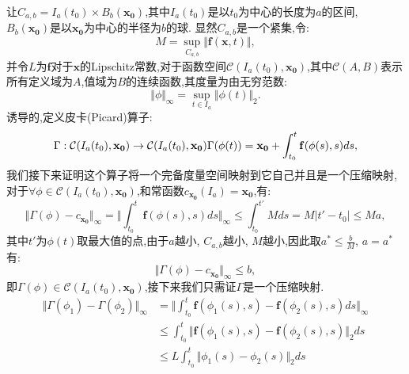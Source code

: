 \begin{pf}
    让$C_{a,b}=I_a(t_0)\times B_b(\mathbf{x_0})$,其中$I_a(t_0)$是以$t_0$为中心的长度为$a$的区间, $B_b(\mathbf{x_0})$是以$\mathbf{x_0}$为中心的半径为$b$的球. 显然$C_{a,b}$是一个紧集,令:
    \begin{equation}
        M=\sup_{C_{a,b}}\Vert \mathbf{f}(\mathbf{x},t)\Vert,
    \end{equation}
    并令$L$为$\mathbf{f}$对于$\mathbf{x}$的Lipschitz常数,对于函数空间$\mathcal{C}(I_a(t_0),\mathbf{x_0})$,其中$\mathcal{C}(A,B)$表示所有定义域为$A$,值域为$B$的连续函数,其度量为由无穷范数:
    \begin{equation}
        \Vert\phi\Vert_{\infty}=\sup_{t\in I_a}\Vert\phi(t)\Vert_2.
    \end{equation}
    诱导的,定义皮卡(Picard)算子:
    \begin{equation}
        \Gamma:\mathcal{C}(I_a(t_0),\mathbf{x_0})\to \mathcal{C}(I_a(t_0),\mathbf{x_0})\\
        \Gamma(\phi(t))=\mathbf{x_0}+\int_{t_0}^t\mathbf{f}(\phi(s),s)ds,
    \end{equation}
    我们接下来证明这个算子将一个完备度量空间映射到它自己并且是一个压缩映射,对于$\forall \phi\in\mathcal{C}(I_a(t_0),\mathbf{x_0})$,和常函数$c_{\mathbf{x_0}}(I_a)=\mathbf{x_0}$,有:
    \begin{equation}
        \Vert \Gamma(\phi)-c_{\mathbf{x_0}}\Vert_{\infty}=\Vert\int_{t_0}^t\mathbf{f}(\phi(s),s)ds\Vert_{\infty}\leq \int_{t_0}^{t'}Mds =M|t'-t_0|\leq Ma,
    \end{equation}
    其中$t'$为$\phi(t)$取最大值的点,由于$a$越小, $C_{a,b}$越小, $M$越小,因此取$a^*\leq \frac{b}{M}$, $a=a^*$有:
    \begin{equation}
        \Vert \Gamma(\phi)-c_{\mathbf{x_0}}\Vert_{\infty}\leq b,
    \end{equation}
    即$\Gamma(\phi)\in\mathcal{C}(I_a(t_0),\mathbf{x_0})$,接下来我们只需证$\Gamma$是一个压缩映射. 
    \begin{equation}
        \begin{aligned}
            \Vert\Gamma(\phi_1)-\Gamma(\phi_2)\Vert_{\infty} & =\Vert \int_{t_0}^t\mathbf{f}(\phi_1(s),s)-\mathbf{f}(\phi_2(s),s)ds\Vert_{\infty} \\
                                                             & \leq\int_{t_0}^t\Vert\mathbf{f}(\phi_1(s),s)-\mathbf{f}(\phi_2(s),s)\Vert_2 ds     \\
                                                             & \leq L\int_{t_0}^t\Vert \phi_1(s)-\phi_2(s)\Vert_2 ds                              \\

\end{aligned}
\end{equation}
\end{pf}
